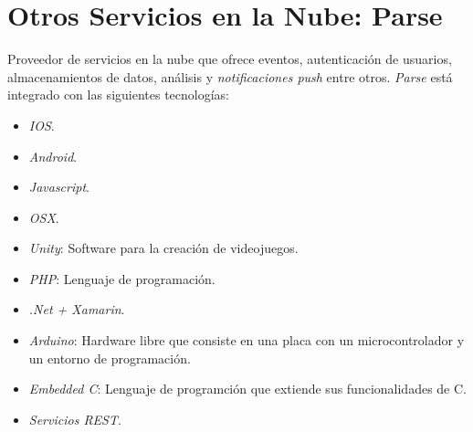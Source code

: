 	\section{Otros Servicios en la Nube: Parse\cite{16:parse:online}}
	Proveedor de servicios en la nube que ofrece eventos, autenticación de usuarios, almacenamientos de datos, análisis y {\it notificaciones push} entre otros.
	{\it Parse} está integrado con las siguientes tecnologías:
	\begin{itemize}
		\item {\it IOS}.
		\item {\it Android}\cite{2:android:online}.
		\item {\it Javascript}.
		\item {\it OSX}.
		\item {\it Unity}: Software para la creación de videojuegos.
		\item {\it PHP}: Lenguaje de programación.
		\item {\it .Net + Xamarin}.
		\item {\it Arduino}: Hardware libre que consiste en una placa con un microcontrolador y un entorno de programación.
		\item {\it Embedded C}: Lenguaje de programción que extiende sus funcionalidades de C.
		\item {\it Servicios REST}.
	\end{itemize}
	
